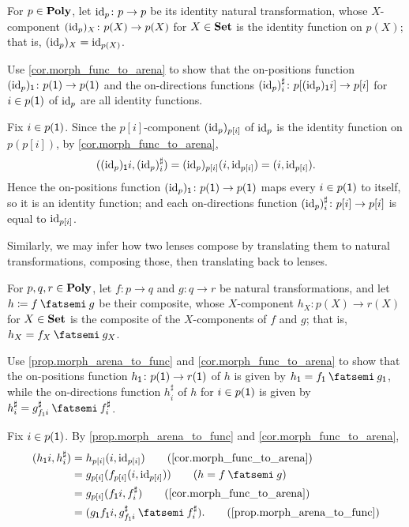\documentclass[Book-Poly]{subfiles}
\begin{document}
\begin{exercise} \label{exc.arena_morph_id}
For $p\in\mathbf{Poly}$, let $\mathrm{id}_p \colon p \to p$ be its identity natural transformation, whose $X$-component $(\mathrm{id}_p)_X\colon p(X)\to p(X)$ for $X\in\mathbf{Set}$ is the identity function on $p(X)$; that is, $(\mathrm{id}_p)_X=\mathrm{id}_{p(X)}$.

Use \cref{cor.morph_func_to_arena} to show that the on-positions function $(\mathrm{id}_p)_{\textsf{1}}\colon p(\textsf{1})\to p(\textsf{1})$ and the on-directions functions $(\mathrm{id}_p)^\sharp_i\colon p[(\mathrm{id}_p)_{\textsf{1}}i]\to p[i]$ for $i\in p(\textsf{1})$ of $\mathrm{id}_p$ are all identity functions.
\begin{solution}
Fix $i\in p(\textsf{1})$.
Since the $p[i]$-component $(\mathrm{id}_p)_{p[i]}$ of $\mathrm{id}_p$ is the identity function on $p(p[i])$, by \cref{cor.morph_func_to_arena},
\[
    ((\mathrm{id}_p)_{\textsf{1}}i, (\mathrm{id}_p)^\sharp_i) = (\mathrm{id}_p)_{p[i]}(i,\mathrm{id}_{p[i]}) = (i,\mathrm{id}_{p[i]}).
\]
Hence the on-positions function $(\mathrm{id}_p)_{\textsf{1}}\colon p(\textsf{1})\to p(\textsf{1})$ maps every $i\in p(\textsf{1})$ to itself, so it is an identity function; and each on-directions function $(\mathrm{id}_p)^\sharp_i\colon p[i]\to p[i]$ is equal to $\mathrm{id}_{p[i]}$.
\end{solution}
\end{exercise}

Similarly, we may infer how two lenses compose by translating them to natural transformations, composing those, then translating back to lenses.


\begin{exercise} \label{exc.arena_morph_comp}
For $p,q,r\in\mathbf{Poly}$, let $f\colon p\to q$ and $g\colon q\to r$ be natural transformations, and let $h\coloneqq f\then g$ be their composite, whose $X$-component $h_X\colon p(X)\to r(X)$ for $X\in\mathbf{Set}$ is the composite of the $X$-components of $f$ and $g$; that is, $h_X=f_X\then g_X$.

Use \cref{prop.morph_arena_to_func} and \cref{cor.morph_func_to_arena} to show that the on-positions function $h_{\textsf{1}}\colon p(\textsf{1})\to r(\textsf{1})$ of $h$ is given by $h_\1=f_\1\then g_\1$, while the on-directions function $h^\sharp_i$ of $h$ for $i\in p(\textsf{1})$ is given by $h^\sharp_i=g^\sharp_{f_\1i}\then f^\sharp_i$.
\begin{solution}
Fix $i\in p(\textsf{1})$.
By \cref{prop.morph_arena_to_func} and \cref{cor.morph_func_to_arena},
\begin{align*}
    (h_\1i, h^\sharp_i) &= h_{p[i]}(i, \id_{p[i]}) \tag{\cref{cor.morph_func_to_arena}} \\
    &= g_{p[i]}(f_{p[i]}(i, \id_{p[i]})) \tag{$h = f \then g$} \\
    &= g_{p[i]}(f_\1i, f^\sharp_i) \tag{\cref{cor.morph_func_to_arena}} \\
    &= (g_\1f_\1i, g^\sharp_{f_\1i} \then f^\sharp_i). \tag{\cref{prop.morph_arena_to_func}}
\end{align*}
\end{solution}
\end{exercise}
\end{document}
